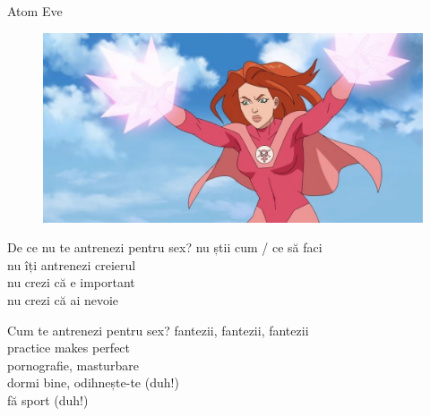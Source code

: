 \documentclass{simple}
\begin{document}
\begin{frame}{Atom Eve}
  \pause
  \begin{figure}
    \centering
    \includegraphics[width=\textwidth]{img/atom-eve.jpg}
  \end{figure}
\end{frame}

\begin{frame}{De ce nu te antrenezi pentru sex?}
  \centering
  \Large
  \pause
  nu știi cum / ce să faci \\
  \vspace{1cm}
  \pause
  nu îți antrenezi creierul \\
  \vspace{1cm}
  \pause
  nu crezi că e important \\
  \vspace{1cm}
  \pause
  nu crezi că ai nevoie
\end{frame}

\begin{frame}{Cum te antrenezi pentru sex?}
  \centering
  \Large
  \pause
  fantezii, fantezii, fantezii \\
  \vspace{1cm}
  \pause
  practice makes perfect \\
  \vspace{1cm}
  \pause
  pornografie, masturbare \\
  \vspace{1cm}
  \pause
  dormi bine, odihnește-te (duh!) \\
  \vspace{1cm}
  \pause
  fă sport (duh!)
\end{frame}
\end{document}
